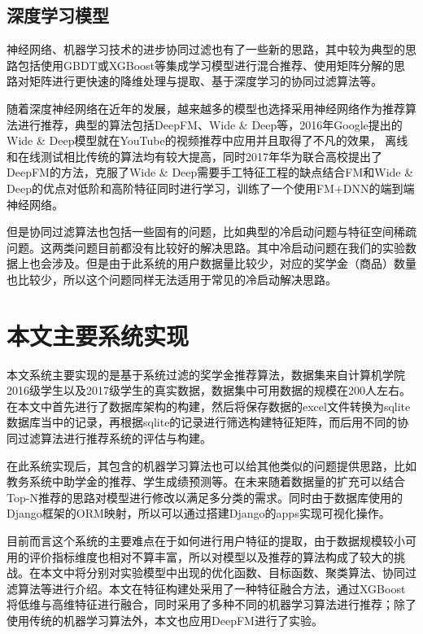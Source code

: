 \subsection{深度学习模型}

神经网络、机器学习技术的进步协同过滤也有了一些新的思路，其中较为典型的思路包括使用GBDT或XGBoost等集成学习模型进行混合推荐、使用矩阵分解的思路对矩阵进行更快速的降维处理与提取、基于深度学习的协同过滤算法等。

随着深度神经网络在近年的发展，越来越多的模型也选择采用神经网络作为推荐算法进行推荐，典型的算法包括DeepFM、Wide \& Deep等，2016年Google提出的Wide \& Deep模型就在YouTube的视频推荐中应用并且取得了不凡的效果，
离线和在线测试相比传统的算法均有较大提高，同时2017年华为联合高校提出了DeepFM的方法，克服了Wide \& Deep需要手工特征工程的缺点结合FM和Wide \& Deep的优点对低阶和高阶特征同时进行学习，训练了一个使用FM+DNN的端到端神经网络。

但是协同过滤算法也包括一些固有的问题，比如典型的冷启动问题与特征空间稀疏问题。这两类问题目前都没有比较好的解决思路。其中冷启动问题在我们的实验数据上也会涉及。但是由于此系统的用户数据量比较少，对应的奖学金（商品）数量也比较少，所以这个问题同样无法适用于常见的冷启动解决思路。

\section{本文主要系统实现}

本文系统主要实现的是基于系统过滤的奖学金推荐算法，数据集来自计算机学院2016级学生以及2017级学生的真实数据，数据集中可用数据的规模在200人左右。在本文中首先进行了数据库架构的构建，然后将保存数据的excel文件转换为sqlite数据库当中的记录，再根据sqlite的记录进行筛选构建特征矩阵，而后用不同的协同过滤算法进行推荐系统的评估与构建。

在此系统实现后，其包含的机器学习算法也可以给其他类似的问题提供思路，比如教务系统中助学金的推荐、学生成绩预测等。在未来随着数据量的扩充可以结合Top-N推荐的思路对模型进行修改以满足多分类的需求。同时由于数据库使用的Django框架的ORM映射，所以可以通过搭建Django的apps实现可视化操作。

目前而言这个系统的主要难点在于如何进行用户特征的提取，由于数据规模较小可用的评价指标维度也相对不算丰富，所以对模型以及推荐的算法构成了较大的挑战。在本文中将分别对实验模型中出现的优化函数、目标函数、聚类算法、协同过滤算法等进行介绍。本文在特征构建处采用了一种特征融合方法，通过XGBoost将低维与高维特征进行融合，同时采用了多种不同的机器学习算法进行推荐；除了使用传统的机器学习算法外，本文也应用DeepFM进行了实验。

